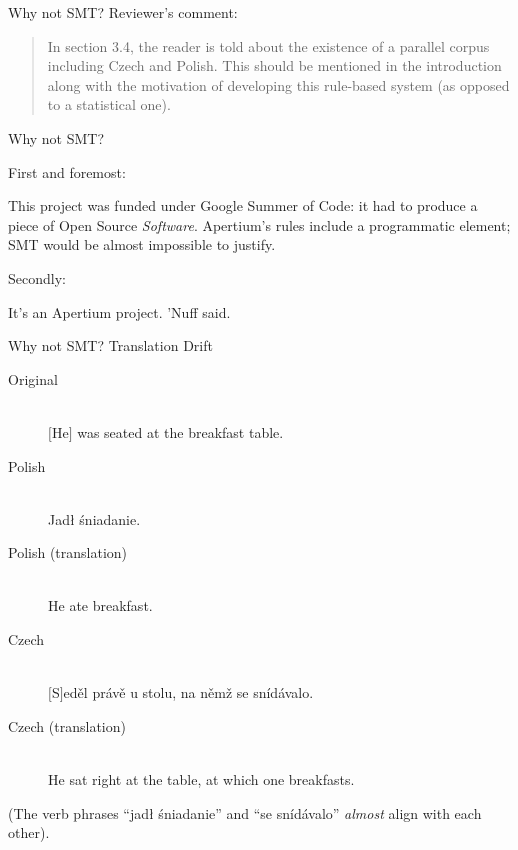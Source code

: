 \documentclass{beamer}
\begin{document}
\begin{frame}{Why not SMT?}
Reviewer's comment:

\begin{quote}
In section 3.4, the reader is told about the existence of a parallel corpus 
including Czech and Polish. This should be mentioned in the introduction along 
with the motivation of developing this rule-based system 
(as opposed to a statistical one).
\end{quote}

%
%
%

\end{frame}

\begin{frame}{Why not SMT?}

First and foremost:

This project was funded under Google Summer of Code: it had to produce a piece
of Open Source {\em Software}. Apertium's rules include a programmatic element;
SMT would be almost impossible to justify.

\pause

Secondly:

It's an Apertium project. 'Nuff said.

\end{frame}

\begin{frame}{Why not SMT? Translation Drift}
\begin{description}
  \item[Original] \hfill \\
  $[$He$]$ was seated at the breakfast table.
  \item[Polish] \hfill \\
  Jadł śniadanie.
  \item[Polish (translation)] \hfill \\
  He ate breakfast.
  \item[Czech] \hfill \\
  $[$S$]$eděl právě u stolu, na němž se snídávalo.
  \item[Czech (translation)] \hfill \\
  He sat right at the table, at which one breakfasts.
\end{description}

(The verb phrases ``jadł śniadanie'' and ``se snídávalo''
{\it almost} align with each other).

\end{frame}
\end{document}
